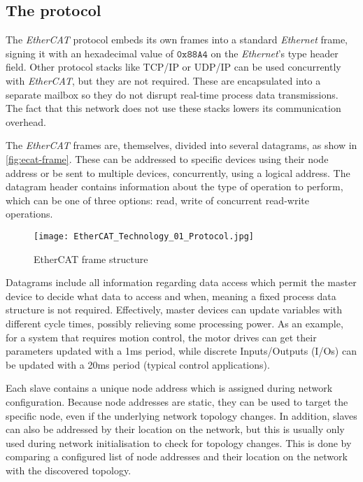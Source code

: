 \subsection{The protocol}

The \emph{EtherCAT} protocol embeds its own frames into a standard \emph{Ethernet} frame, signing it with an hexadecimal value of $\mathtt{0x88A4}$ on the \emph{Ethernet}'s type header field.
Other protocol stacks like TCP/IP or UDP/IP can be used concurrently with \emph{EtherCAT}, but they are not required.
These are encapsulated into a separate mailbox so they do not disrupt real-time process data transmissions.
The fact that this network does not use these stacks lowers its communication overhead.

The \emph{EtherCAT} frames are, themselves, divided into several datagrams, as show in \autoref{fig:ecat-frame}.
These can be addressed to specific devices using their node address or be sent to multiple devices, concurrently, using a logical address.
The datagram header contains information about the type of operation to perform, which can be one of three options: read, write of concurrent read-write operations.

\begin{figure}[htp]
	\centering
	\texttt{[image: EtherCAT\_Technology\_01\_Protocol.jpg]}
	\caption{EtherCAT frame structure \cite{protocol:ethercat}}
	\label{fig:ecat-frame}
\end{figure}

Datagrams include all information regarding data access which permit the master device to decide what data to access and when, meaning a fixed process data structure is not required.
Effectively, master devices can update variables with different cycle times, possibly relieving some processing power.
As an example, for a system that requires motion control, the motor drives can get their parameters updated with a 1ms period, while discrete Inputs/Outputs (I/Os) can be updated with a 20ms period (typical control applications).

Each slave contains a unique node address which is assigned during network configuration.
Because node addresses are static, they can be used to target the specific node, even if the underlying network topology changes.
In addition, slaves can also be addressed by their location on the network, but this is usually only used during network initialisation to check for topology changes.
This is done by comparing a configured list of node addresses and their location on the network with the discovered topology.

